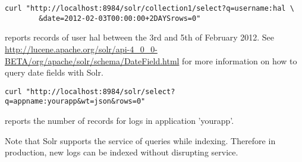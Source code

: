 \documentclass[twoside,11pt]{article}
\begin{document}
\begin{verbatim}
curl "http://localhost:8984/solr/collection1/select?q=username:hal \
        &date=2012-02-03T00:00:00+2DAYSrows=0"
\end{verbatim}
reports records of user hal between the 3rd and 5th of February 2012. See \url{http://lucene.apache.org/solr/api-4_0_0-BETA/org/apache/solr/schema/DateField.html} for more information on how to query date fields with Solr.

\begin{verbatim}
curl "http://localhost:8984/solr/select?q=appname:yourapp&wt=json&rows=0"
\end{verbatim}
reports the number of records for logs in application 'yourapp'.

Note that Solr supports the service of queries while indexing. Therefore in production, new logs can be indexed without disrupting service.
\end{document}
